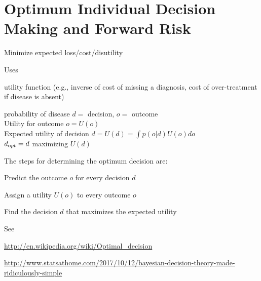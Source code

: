\section{Optimum Individual Decision Making and Forward Risk}
\bi
\item Minimize expected loss/cost/disutility
\item Uses
 \bi
 \item utility function (e.g., inverse of cost of missing a diagnosis, cost of
 over-treatment if disease is absent)
 \item probability of disease
 \ei
\ei
$d =$ decision, $o =$ outcome\\
Utility for outcome $o = U(o)$\\
Expected utility of decision $d = U(d) = \int p(o | d) U(o)do$\\
$d_{\textrm opt} = d$ maximizing $U(d)$

The steps for determining the optimum decision are:
\be
\item Predict the outcome $o$ for every decision $d$
\item Assign a utility $U(o)$ to every outcome $o$
\item Find the decision $d$ that maximizes the expected utility
\ee

See
\bi
\item \url{http://en.wikipedia.org/wiki/Optimal_decision}
\item \url{http://www.statsathome.com/2017/10/12/bayesian-decision-theory-made-ridiculously-simple}
\ei



